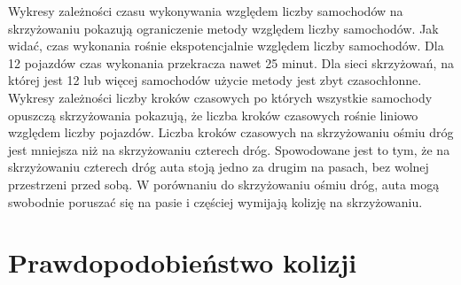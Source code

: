 Wykresy zależności czasu wykonywania względem liczby samochodów na skrzyżowaniu pokazują ograniczenie metody względem liczby samochodów. Jak widać, czas wykonania rośnie ekspotencjalnie względem liczby samochodów. Dla 12 pojazdów czas wykonania przekracza nawet 25 minut. Dla sieci skrzyżowań, na której jest 12 lub więcej samochodów użycie metody jest zbyt czasochłonne.
\newline
\indent
Wykresy zależności liczby kroków czasowych po których wszystkie samochody opuszczą skrzyżowania pokazują, że liczba kroków czasowych rośnie liniowo względem liczby pojazdów. 
\newline
\indent
Liczba kroków czasowych na skrzyżowaniu ośmiu dróg jest mniejsza niż na skrzyżowaniu czterech dróg. Spowodowane jest to tym, że na skrzyżowaniu czterech dróg auta stoją jedno za drugim na pasach, bez wolnej przestrzeni przed sobą. W porównaniu do skrzyżowaniu ośmiu dróg, auta mogą swobodnie poruszać się na pasie i częściej wymijają kolizję na skrzyżowaniu.

\section{Prawdopodobieństwo kolizji}

